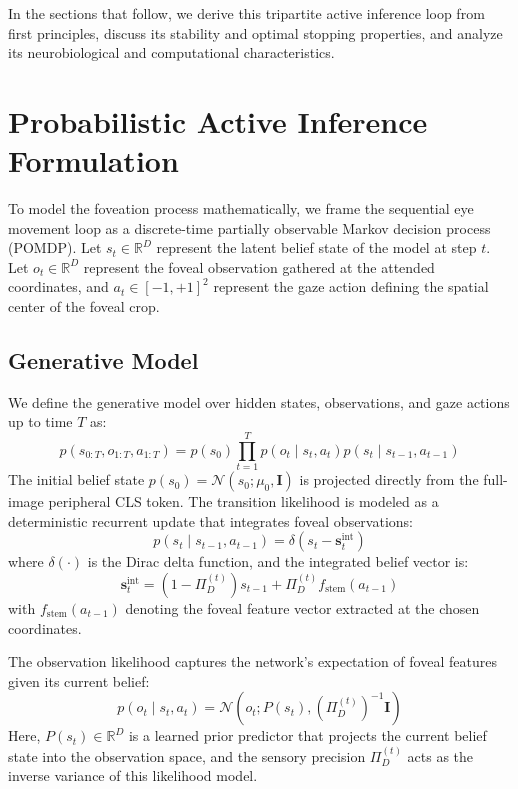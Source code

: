 In the sections that follow, we derive this tripartite active inference loop from first principles, discuss its stability and optimal stopping properties, and analyze its neurobiological and computational characteristics.

\section{Probabilistic Active Inference Formulation}
To model the foveation process mathematically, we frame the sequential eye movement loop as a discrete-time partially observable Markov decision process (POMDP). Let $s_t \in \mathbb{R}^D$ represent the latent belief state of the model at step $t$. Let $o_t \in \mathbb{R}^D$ represent the foveal observation gathered at the attended coordinates, and $a_t \in [-1, +1]^2$ represent the gaze action defining the spatial center of the foveal crop.

\subsection{Generative Model}
We define the generative model over hidden states, observations, and gaze actions up to time $T$ as:
\begin{equation}
p(s_{0:T}, o_{1:T}, a_{1:T}) = p(s_0) \prod_{t=1}^T p(o_t \mid s_t, a_t) p(s_t \mid s_{t-1}, a_{t-1})
\end{equation}
The initial belief state $p(s_0) = \mathcal{N}(s_0; \mu_0, \mathbf{I})$ is projected directly from the full-image peripheral CLS token. The transition likelihood is modeled as a deterministic recurrent update that integrates foveal observations:
\begin{equation}
p(s_t \mid s_{t-1}, a_{t-1}) = \delta\left(s_t - \mathbf{s}_t^{\text{int}}\right)
\end{equation}
where $\delta(\cdot)$ is the Dirac delta function, and the integrated belief vector is:
\begin{equation}
\mathbf{s}_t^{\text{int}} = (1 - \Pi_D^{(t)})s_{t-1} + \Pi_D^{(t)} f_{\text{stem}}(a_{t-1})
\end{equation}
with $f_{\text{stem}}(a_{t-1})$ denoting the foveal feature vector extracted at the chosen coordinates.

The observation likelihood captures the network's expectation of foveal features given its current belief:
\begin{equation}
p(o_t \mid s_t, a_t) = \mathcal{N}\left(o_t; P(s_t), \left(\Pi_D^{(t)}\right)^{-1} \mathbf{I}\right)
\end{equation}
Here, $P(s_t) \in \mathbb{R}^D$ is a learned prior predictor that projects the current belief state into the observation space, and the sensory precision $\Pi_D^{(t)}$ acts as the inverse variance of this likelihood model.


